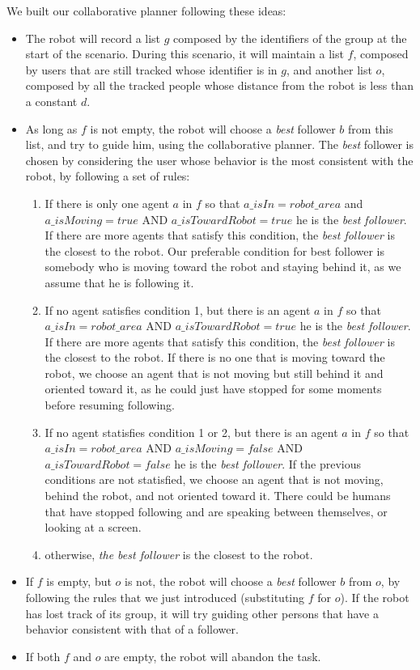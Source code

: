 
We built our collaborative planner following these ideas:
\begin{itemize}
\item The robot will record a list $g$ composed by the identifiers of the group at the start of the scenario. During this scenario, it will maintain a list $f$, composed by users that are still tracked whose identifier is in $g$, and another list $o$, composed by all the tracked people whose distance from the robot is less than a constant $d$. 
\item As long as $f$ is not empty, the robot will choose a \textit{best} follower $b$ from this list, and try to guide him, using the collaborative planner. The \textit{best} follower is chosen by considering the user whose behavior is the most consistent with the robot, by following a set of rules:
	\begin{enumerate}
		\item If there is only one agent $a$ in $f$ so that $a\_isIn=robot\_area$ and $a\_isMoving=true$ AND $a\_isTowardRobot=true$ he is the \textit{best follower}. If there are more agents that satisfy this condition, the \textit{best follower} is the closest to the robot. Our preferable condition for best follower is somebody who is moving toward the robot and staying behind it, as we assume that he is following it.
		\item If no agent satisfies condition 1, but there is an agent $a$ in $f$ so that $a\_isIn=robot\_area$ AND $a\_isTowardRobot=true$ he is the \textit{best follower}. If there are more agents that satisfy this condition, the \textit{best follower} is the closest to the robot. If there is no one that is moving toward the robot, we choose an agent that is not moving but still behind it and oriented toward it, as he could just have stopped for some moments before resuming following.
		\item If no agent statisfies condition 1 or 2, but there is an agent $a$ in $f$ so that $a\_isIn=robot\_area$ AND $a\_isMoving=false$ AND $a\_isTowardRobot=false$ he is the \textit{best follower}. If the previous conditions are not statisfied, we choose an agent that is not moving, behind the robot, and not oriented toward it. There could be humans that have stopped following and are speaking between themselves, or looking at a screen.
		\item otherwise, \textit{the best follower} is the closest to the robot.
	\end{enumerate}
\item If $f$ is empty, but $o$ is not, the robot will choose a \textit{best} follower $b$ from $o$, by following the rules that we just introduced (substituting $f$ for $o$). If the robot has lost track of its group, it will try guiding other persons that have a behavior consistent with that of a follower.  
\item If  both $f$ and $o$ are empty, the robot will abandon the task.
\end{itemize}

